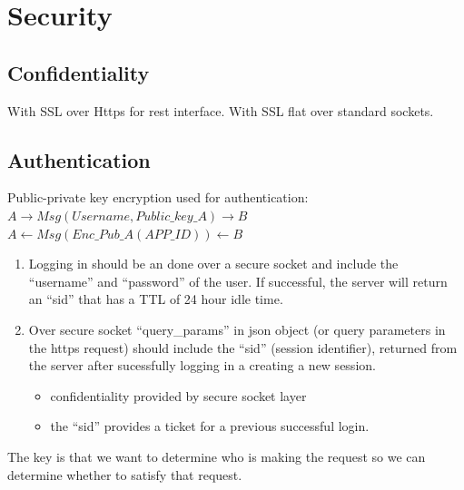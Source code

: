 \documentclass[10pt,print,letterpaper]{sigplan-proc-varsize}
\begin{document}
\section{Security}

\subsection{Confidentiality}
With SSL over Https for rest interface.
With SSL flat over standard sockets.

\subsection{Authentication}
Public-private key encryption used for authentication: \\
$A \rightarrow Msg(Username, Public\_key\_A) \rightarrow B$ \\
$A \leftarrow Msg(Enc\_Pub\_A(APP\_ID)) \leftarrow B$ \\

\begin{enumerate}
\item Logging in should be an done over a secure socket and include the ``username'' and ``password'' of the user.  If 
		successful, the server will return an ``sid'' that has a TTL of 24 hour idle time.

\item Over secure socket ``query\_params'' in json object (or query parameters in the https request) should 
		include the ``sid'' (session identifier), returned from the server after sucessfully logging in a creating a new session.\\	
	\begin{itemize}
	\item confidentiality provided by secure socket layer
	\item the ``sid'' provides a ticket for a previous successful login.
	\end{itemize}

\end{enumerate}

The key is that we want to determine who is making the request so we can determine whether to satisfy that request.
\end{document}
